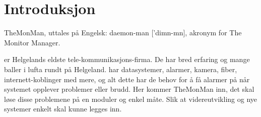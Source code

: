 \chapter{Introduksjon}
\label{chap:introduction}



%
%
%
%
%
%


TheMonMan, uttales på Engelsk: daemon-man ['dim\textschwa{}n-m\textschwa{}n], akronym for The Monitor Manager.

\TMX er Helgelands eldste tele-kommunikasjons-firma. De har bred erfaring og mange baller i lufta rundt på Helgeland. 
\TMX har datasystemer, alarmer, kamera, fiber, internett-koblinger med mere, og alt dette har de behov for å få alarmer på når systemet opplever problemer eller brudd. Her kommer TheMonMan inn, det skal løse disse problemene på en moduler og enkel måte. Slik at videreutvikling og nye systemer enkelt skal kunne legges inn.
  